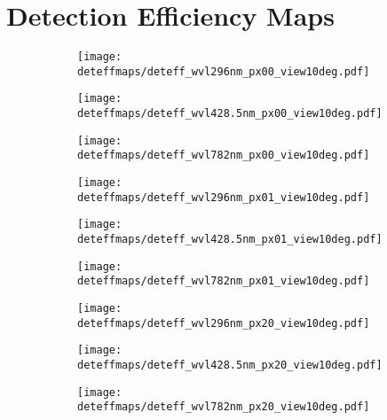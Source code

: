 \section{Detection Efficiency Maps}\label{appendix:deteffmaps}

\begin{figure}[H]
	\centering
	\begin{subfigure}[t]{0.79\textwidth}
		\centering
		\texttt{[image: deteffmaps/deteff\_wvl296nm\_px00\_view10deg.pdf]}
		\subcaption{}
	\end{subfigure}
	\begin{subfigure}[t]{0.79\textwidth}
		\centering
		\texttt{[image: deteffmaps/deteff\_wvl428.5nm\_px00\_view10deg.pdf]}
		\subcaption{}
	\end{subfigure}	
	\begin{subfigure}[t]{0.79\textwidth}
		\centering
		\texttt{[image: deteffmaps/deteff\_wvl782nm\_px00\_view10deg.pdf]}
		\subcaption{}
	\end{subfigure}
\end{figure}
\begin{figure}[H]
	\ContinuedFloat
	\centering
	\begin{subfigure}[t]{0.79\textwidth}
		\centering
		\texttt{[image: deteffmaps/deteff\_wvl296nm\_px01\_view10deg.pdf]}
		\subcaption{}
	\end{subfigure}
	\begin{subfigure}[t]{0.79\textwidth}
		\centering
		\texttt{[image: deteffmaps/deteff\_wvl428.5nm\_px01\_view10deg.pdf]}
		\subcaption{}
	\end{subfigure}	
	\begin{subfigure}[t]{0.79\textwidth}
		\centering
		\texttt{[image: deteffmaps/deteff\_wvl782nm\_px01\_view10deg.pdf]}
		\subcaption{}
	\end{subfigure}
\end{figure}
\begin{figure}[H]
	\ContinuedFloat
	\centering
	\begin{subfigure}[t]{0.79\textwidth}
		\centering
		\texttt{[image: deteffmaps/deteff\_wvl296nm\_px20\_view10deg.pdf]}
		\subcaption{}
	\end{subfigure}
	\begin{subfigure}[t]{0.79\textwidth}
		\centering
		\texttt{[image: deteffmaps/deteff\_wvl428.5nm\_px20\_view10deg.pdf]}
		\subcaption{}
	\end{subfigure}	
	\begin{subfigure}[t]{0.79\textwidth}
		\centering
		\texttt{[image: deteffmaps/deteff\_wvl782nm\_px20\_view10deg.pdf]}
		\subcaption{}
	\end{subfigure}
\end{figure}
